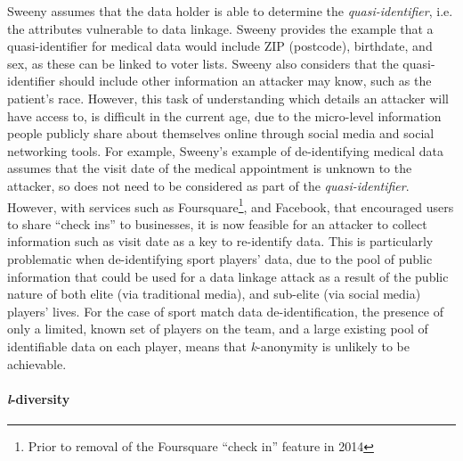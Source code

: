 Sweeny assumes that the data holder is able to determine the \textit{quasi-identifier}, i.e. the attributes vulnerable to data linkage. Sweeny provides the example that a quasi-identifier for medical data would include ZIP (postcode), birthdate, and sex, as these can be linked to voter lists. Sweeny also considers that the quasi-identifier should include other information an attacker may know, such as the patient's race. However, this task of understanding which details an attacker will have access to, is difficult in the current age, due to the micro-level information people publicly share about themselves online through social media and social networking tools. For example, Sweeny's example of de-identifying medical data assumes that the visit date of the medical appointment is unknown to the attacker, so does not need to be considered as part of the \textit{quasi-identifier}. However, with services such as Foursquare\footnote{Prior to removal of the Foursquare ``check in'' feature in 2014}, and Facebook, that encouraged users to share ``check ins'' to businesses, it is now feasible for an attacker to collect information such as visit date as a key to re-identify data. This is particularly problematic when de-identifying sport players' data, due to the pool of public information that could be used for a data linkage attack as a result of the public nature of both elite (via traditional media), and sub-elite (via social media) players' lives. For the case of sport match data de-identification, the presence of only %
a limited, known set of players on the team, and a large existing pool of identifiable data on each player, means that \textit{k}-anonymity is unlikely to be achievable.


\paragraph{\textit{l}-diversity}

